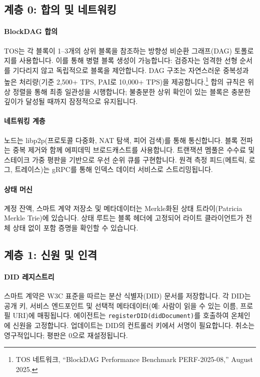 \documentclass[11pt]{article}
\begin{document}
\subsection{계층 0: 합의 및 네트워킹}
\paragraph{BlockDAG 합의} TOS는 각 블록이 1--3개의 상위 블록을 참조하는 방향성 비순환 그래프(DAG) 토폴로지를 사용합니다. 이를 통해 병렬 블록 생성이 가능합니다: 검증자는 엄격한 선형 순서를 기다리지 않고 독립적으로 블록을 제안합니다. DAG 구조는 자연스러운 중복성과 높은 처리량(기준 2,500+ TPS, PAI로 10,000+ TPS)을 제공합니다.\footnote{TOS 네트워크, ``BlockDAG Performance Benchmark PERF-2025-08,'' August 2025.} 합의 규칙은 위상 정렬을 통해 최종 일관성을 시행합니다; 불충분한 상위 확인이 있는 블록은 충분한 깊이가 달성될 때까지 잠정적으로 유지됩니다.

\paragraph{네트워킹 계층} 노드는 libp2p(프로토콜 다중화, NAT 탐색, 피어 검색)를 통해 통신합니다. 블록 전파는 중복 제거와 함께 에피데믹 브로드캐스트를 사용합니다. 트랜잭션 멤풀은 수수료 및 스테이크 가중 평판을 기반으로 우선 순위 큐를 구현합니다. 원격 측정 피드(메트릭, 로그, 트레이스)는 gRPC를 통해 인덱스 데이터 서비스로 스트리밍됩니다.

\paragraph{상태 머신} 계정 잔액, 스마트 계약 저장소 및 메타데이터는 Merkle화된 상태 트라이(Patricia Merkle Trie)에 있습니다. 상태 루트는 블록 헤더에 고정되어 라이트 클라이언트가 전체 상태 없이 포함 증명을 확인할 수 있습니다.

\subsection{계층 1: 신원 및 인격}
\paragraph{DID 레지스트리} 스마트 계약은 W3C 표준을 따르는 분산 식별자(DID) 문서를 저장합니다. 각 DID는 공개 키, 서비스 엔드포인트 및 선택적 메타데이터(예: 사람이 읽을 수 있는 이름, 프로필 URI)에 매핑됩니다. 에이전트는 \texttt{registerDID(didDocument)}를 호출하여 온체인에 신원을 고정합니다. 업데이트는 DID의 컨트롤러 키에서 서명이 필요합니다. 취소는 영구적입니다; 평판은 0으로 재설정됩니다.
\end{document}
